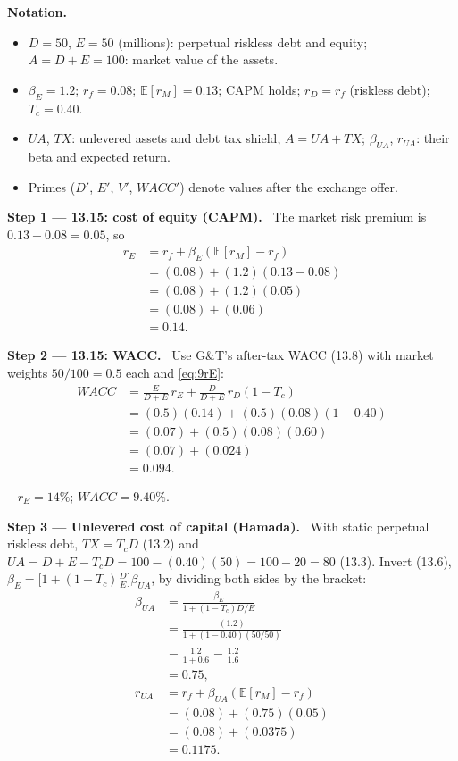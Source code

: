 \documentclass[11pt,a4paper]{article}
\numberwithin{equation}{section}
\newcommand{\notation}{\par\smallskip\noindent\textbf{Notation.}}
\newcommand{\step}[2]{\par\smallskip\noindent\textbf{Step #1 --- #2.}~}
\newcommand{\answer}[1]{\par\smallskip\noindent\fbox{\textbf{Answer #1.}}~}
\newcommand{\E}{\mathbb{E}}
\begin{document}
\notation
\begin{itemize}
  \item $D=50$, $E=50$ (millions): perpetual riskless debt and equity; $A=D+E=100$: market value of the assets.
  \item $\beta_E=1.2$; $r_f=0.08$; $\E[r_M]=0.13$; CAPM holds; $r_D=r_f$ (riskless debt); $T_c=0.40$.
  \item $\mathit{UA}$, $\mathit{TX}$: unlevered assets and debt tax shield, $A=\mathit{UA}+\mathit{TX}$; $\beta_{UA}$, $r_{UA}$: their beta and expected return.
  \item Primes ($D'$, $E'$, $V'$, $\mathit{WACC}'$) denote values after the exchange offer.
\end{itemize}

\step{1}{13.15: cost of equity (CAPM)} The market risk premium is $0.13-0.08=0.05$, so
\begin{align}
  r_E &= r_f+\beta_E(\E[r_M]-r_f) \nonumber\\
      &= (0.08)+(1.2)(0.13-0.08) \nonumber\\
      &= (0.08)+(1.2)(0.05) \nonumber\\
      &= (0.08)+(0.06) \nonumber\\
      &= 0.14. \label{eq:9rE}
\end{align}

\step{2}{13.15: WACC} Use G\&T's after-tax WACC (13.8) with market weights $50/100=0.5$ each and
\eqref{eq:9rE}:
\begin{align}
  \mathit{WACC} &= \frac{E}{D+E}\,r_E+\frac{D}{D+E}\,r_D(1-T_c) \label{eq:9W}\\
      &= (0.5)(0.14)+(0.5)(0.08)(1-0.40) \nonumber\\
      &= (0.07)+(0.5)(0.08)(0.60) \nonumber\\
      &= (0.07)+(0.024) \nonumber\\
      &= 0.094. \nonumber
\end{align}
\answer{(13.15)} $r_E=14\%$; $\mathit{WACC}=9.40\%$.

\step{3}{Unlevered cost of capital (Hamada)} With static perpetual riskless debt,
$\mathit{TX}=T_cD$ (13.2) and $\mathit{UA}=D+E-T_cD=100-(0.40)(50)=100-20=80$ (13.3). Invert
(13.6), $\beta_E=\bigl[1+(1-T_c)\tfrac{D}{E}\bigr]\beta_{UA}$, by dividing both sides by the
bracket:
\begin{align}
  \beta_{UA} &= \frac{\beta_E}{1+(1-T_c)D/E} \label{eq:9bUA}\\
      &= \frac{(1.2)}{1+(1-0.40)(50/50)} \nonumber\\
      &= \frac{1.2}{1+0.6} = \frac{1.2}{1.6} \nonumber\\
      &= 0.75, \nonumber\\
  r_{UA} &= r_f+\beta_{UA}(\E[r_M]-r_f) \label{eq:9rUA}\\
      &= (0.08)+(0.75)(0.05) \nonumber\\
      &= (0.08)+(0.0375) \nonumber\\
      &= 0.1175. \nonumber
\end{align}
\end{document}
